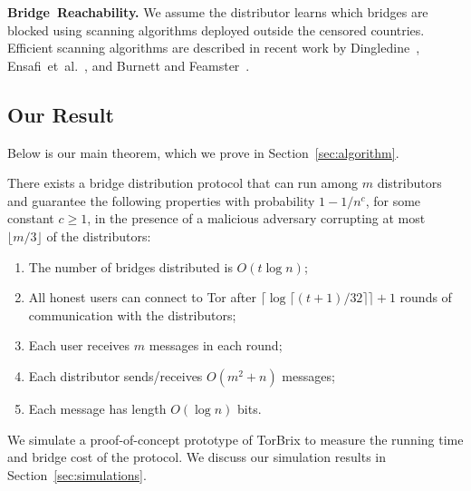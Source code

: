 \documentclass{llncs}
\newcommand{\etal}{et~al.}
\newcommand{\todo}[1]{{\leavevmode\color{blue}[TODO: #1]}}
\newcommand{\sfsize}{\fontsize{0.73\baselineskip}{0.73\baselineskip}\selectfont}
\newcommand{\sans}[1]{\textsf{\sfsize \mbox{#1}}}
\newcommand{\sansb}[1]{\textbf{\sans{\mbox{#1}}}}
\newcommand{\para}[1]{\vspace{0.55em} \noindent \sansb{{\mbox{#1}}}}
\newcommand{\brix}{\sans{TorBrix}\xspace}
\begin{document}
\para{Bridge Reachability.}  We assume the distributor learns which bridges are blocked using scanning algorithms deployed outside the censored countries.  Efficient scanning algorithms are described in recent work by Dingledine~\cite{Dingledine:BridgeReach:2011}, Ensafi~\etal~\cite{Ensafi:2014:PAM}, and Burnett and Feamster~\cite{Burnett:2015:ELM}. 

\subsection{Our Result} \label{sec:results}
\noindent Below is our main theorem, which we prove in Section~\ref{sec:algorithm}.
\begin{theorem}
	\label{thm:main} There exists a bridge distribution protocol that can run among $m$ distributors and guarantee the following properties with probability ${1 - 1/n^c}$, for some constant ${c \geq 1}$, in the presence of a malicious adversary corrupting at most $\lfloor m/3 \rfloor$ of the distributors: %
	\begin{enumerate}[itemsep=-0.25em,topsep=0.5em]
		\item The number of bridges distributed is $O(t\log{n})$;
		\item All honest users can connect to Tor after ${\lceil \log{\lceil (t+1)/32 \rceil} \rceil + 1}$ rounds of communication with the distributors;
		\item Each user receives $m$ messages in each round;
		\item Each distributor sends/receives $O(m^2 + n)$ messages;
		\item Each message has length $O(\log{n})$ bits.
	\end{enumerate}
\end{theorem}

We simulate a proof-of-concept prototype of \brix to measure the running time and bridge cost of the protocol. We discuss our simulation results in Section~\ref{sec:simulations}.


\end{document}
